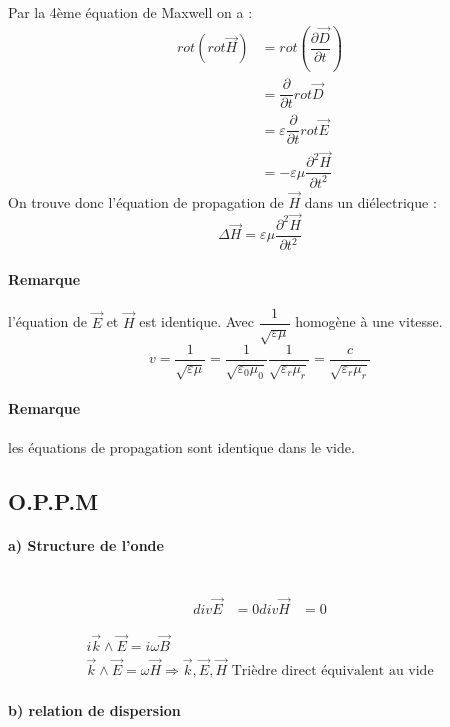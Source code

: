 \documentclass[12pt,a4paper]{report}
\begin{document}
Par la 4ème équation de Maxwell on a :
\begin{align*}
	rot (rot \vec{H}) &= rot \left( \dfrac{\partial \vec{D}}{\partial t}\right)\\
	&= \dfrac{\partial}{\partial t} rot \vec{D}\\
	&= \varepsilon \dfrac{\partial}{\partial t} rot \vec{E}\\
	&= -\varepsilon \mu \dfrac{\partial^2 \vec{H}}{\partial t^2}
\end{align*}
On trouve donc l'équation de propagation de \(\vec{H}\) dans un diélectrique :
\[
	\Delta \vec{H} = \varepsilon \mu \dfrac{\partial^2 \vec{H}}{\partial t^2}
\]

\paragraph{Remarque} l'équation de \(\vec{E}\) et \(\vec{H}\) est identique. Avec \(\dfrac{1}{\sqrt{\varepsilon\mu}}\) homogène à une vitesse.
\[
	v = \dfrac{1}{\sqrt{\varepsilon\mu}} = \dfrac{1}{\sqrt{\varepsilon_0\mu_0}} \dfrac{1}{\sqrt{\varepsilon_r\mu_r}} = \dfrac{c}{\sqrt{\varepsilon_r\mu_r}}
\]

\paragraph{Remarque} les équations de propagation sont identique dans le vide.

\subsection{O.P.P.M}

\paragraph{a) Structure de l'onde} \quad \\
\begin{align*}
	div \vec{E} &= 0
	div \vec{H} &= 0
\end{align*}

\begin{align*}
	i\vec{k} \wedge \vec{E} = i\omega \vec{B}\\
	\vec{k} \wedge \vec{E} = \omega \vec{H} \Rightarrow \vec{k}, \vec{E}, \vec{H} \text{ Trièdre direct équivalent au vide}
\end{align*}

\paragraph{b) relation de dispersion}\quad \\
\end{document}

